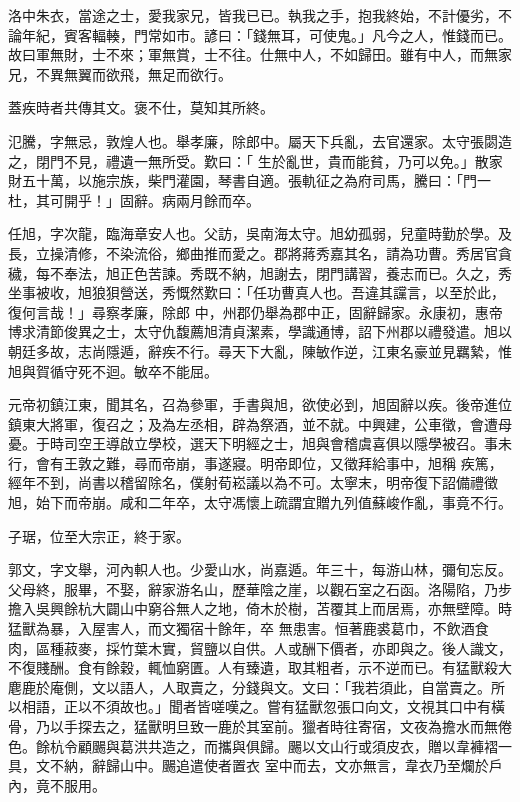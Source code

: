 \begin{pinyinscope}
 洛中朱衣，當途之士，愛我家兄，皆我已已。執我之手，抱我終始，不計優劣，不論年紀，賓客輻輳，門常如市。諺曰：「錢無耳，可使鬼。」凡今之人，惟錢而已。故曰軍無財，士不來；軍無賞，士不往。仕無中人，不如歸田。雖有中人，而無家兄，不異無翼而欲飛，無足而欲行。



 蓋疾時者共傳其文。褒不仕，莫知其所終。



 氾騰，字無忌，敦煌人也。舉孝廉，除郎中。屬天下兵亂，去官還家。太守張閟造之，閉門不見，禮遺一無所受。歎曰：「
 生於亂世，貴而能貧，乃可以免。」散家財五十萬，以施宗族，柴門灌園，琴書自適。張軌征之為府司馬，騰曰：「門一杜，其可開乎！」固辭。病兩月餘而卒。



 任旭，字次龍，臨海章安人也。父訪，吳南海太守。旭幼孤弱，兒童時勤於學。及長，立操清修，不染流俗，鄉曲推而愛之。郡將蔣秀嘉其名，請為功曹。秀居官貪穢，每不奉法，旭正色苦諫。秀既不納，旭謝去，閉門講習，養志而已。久之，秀坐事被收，旭狼狽營送，秀慨然歎曰：「任功曹真人也。吾違其讜言，以至於此，復何言哉！」尋察孝廉，除郎
 中，州郡仍舉為郡中正，固辭歸家。永康初，惠帝博求清節俊異之士，太守仇馥薦旭清貞潔素，學識通博，詔下州郡以禮發遣。旭以朝廷多故，志尚隱遁，辭疾不行。尋天下大亂，陳敏作逆，江東名豪並見羈縶，惟旭與賀循守死不迴。敏卒不能屈。



 元帝初鎮江東，聞其名，召為參軍，手書與旭，欲使必到，旭固辭以疾。後帝進位鎮東大將軍，復召之；及為左丞相，辟為祭酒，並不就。中興建，公車徵，會遭母憂。于時司空王導啟立學校，選天下明經之士，旭與會稽虞喜俱以隱學被召。事未行，會有王敦之難，尋而帝崩，事遂寢。明帝即位，又徵拜給事中，旭稱
 疾篤，經年不到，尚書以稽留除名，僕射荀崧議以為不可。太寧末，明帝復下詔備禮徵旭，始下而帝崩。咸和二年卒，太守馮懷上疏謂宜贈九列值蘇峻作亂，事竟不行。



 子琚，位至大宗正，終于家。



 郭文，字文舉，河內軹人也。少愛山水，尚嘉遁。年三十，每游山林，彌旬忘反。父母終，服畢，不娶，辭家游名山，歷華陰之崖，以觀石室之石函。洛陽陷，乃步擔入吳興餘杭大闢山中窮谷無人之地，倚木於樹，苫覆其上而居焉，亦無壁障。時猛獸為暴，入屋害人，而文獨宿十餘年，卒
 無患害。恒著鹿裘葛巾，不飲酒食肉，區種菽麥，採竹葉木實，貿鹽以自供。人或酬下價者，亦即與之。後人識文，不復賤酬。食有餘穀，輒恤窮匱。人有臻遺，取其粗者，示不逆而已。有猛獸殺大麀鹿於庵側，文以語人，人取賣之，分錢與文。文曰：「我若須此，自當賣之。所以相語，正以不須故也。」聞者皆嗟嘆之。嘗有猛獸忽張口向文，文視其口中有橫骨，乃以手探去之，猛獸明旦致一鹿於其室前。獵者時往寄宿，文夜為擔水而無倦色。餘杭令顧颺與葛洪共造之，而攜與俱歸。颺以文山行或須皮衣，贈以韋褲褶一具，文不納，辭歸山中。颺追遣使者置衣
 室中而去，文亦無言，韋衣乃至爛於戶內，竟不服用。




\end{pinyinscope}
